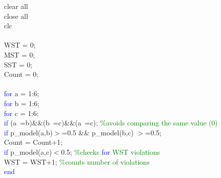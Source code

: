 \hspace{1mm}clear all \\ 
\hspace{1mm}close all \\ 
\hspace{1mm}clc \\ 
\hspace{1mm} \\ 
 
\hspace{1mm}\indent WST = 0; \\ 
\hspace{1mm}\indent MST = 0; \\ 
\hspace{1mm}\indent SST = 0; \\ 
\hspace{1mm}\indent Count = 0; \\ 
\hspace{1mm}\indent  \\ 
\hspace{1mm}\indent \textcolor{blue}{for} a = 1:6; \\ 
\hspace{1mm}\indent \indent \textcolor{blue}{for} b = 1:6; \\ 
\hspace{1mm}\indent \indent \indent \textcolor{blue}{for} c = 1:6; \\ 
\hspace{1mm}\indent \indent \indent \indent \textcolor{blue}{if} (a~=b)\&\&(b~=c)\&\&(a~=c); \textcolor{green}{\%avoids comparing the same value (0) }\\ 
\hspace{1mm}\indent \indent \indent \indent \indent \textcolor{blue}{if} p\_model(a,b)$>$=0.5 \&\& p\_model(b,c) $>$=0.5; \\ 
\hspace{1mm}\indent \indent \indent \indent \indent \indent Count = Count+1; \\ 
\hspace{1mm}\indent \indent \indent \indent \indent \indent \textcolor{blue}{if} p\_model(a,c)$<$0.5; \textcolor{green}{\%checks \textcolor{blue}{for} WST violations }\\ 
\hspace{1mm}\indent \indent \indent \indent \indent \indent \indent \indent WST = WST+1; \textcolor{green}{\%counts number of violations }\\ 
\hspace{1mm}\indent \indent \indent \indent \indent \indent \indent \textcolor{blue}{end} \\ 
